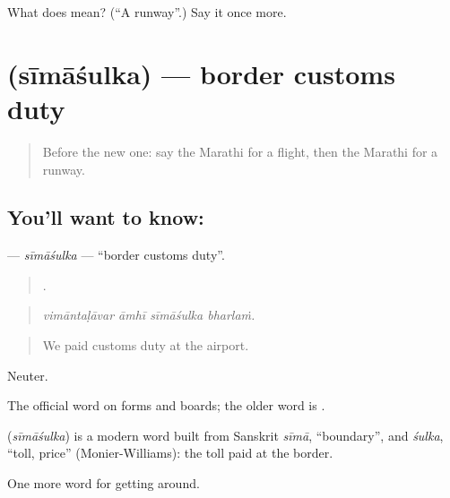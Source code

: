 \begin{tcolorbox}[breakable,colback=teal!4,colframe=teal!35!black,title={Before you move on}]
What does  mean? (\textquotedblleft{}A runway\textquotedblright{}.) Say it once more.
\end{tcolorbox}
\section[\texorpdfstring{\mr{सीमाशुल्क} (sīmāśulka)}{सीमाशुल्क (sīmāśulka)}]{ (sīmāśulka) — border customs duty}

\label{lesson:MR-C405-simasulka}



\begin{quote}
Before the new one: say the Marathi for a flight, then the Marathi for a runway.
\end{quote}

\subsection*{You'll want to know: }
\textbf{} — \emph{sīmāśulka} — \textquotedblleft{}border customs duty\textquotedblright{}.

\begin{quote}
   .
\end{quote}

\begin{quote}
\emph{vimāntaḷāvar āmhī sīmāśulka bharlaṁ.}
\end{quote}

\begin{quote}
We paid customs duty at the airport.
\end{quote}

Neuter.

The official word on forms and boards; the older word is .

\begin{cousinweb}
\textbf{} (\emph{sīmāśulka}) is a modern word built from Sanskrit \emph{sīmā}, \textquotedblleft{}boundary\textquotedblright{}, and \emph{śulka}, \textquotedblleft{}toll, price\textquotedblright{} (Monier-Williams): the toll paid at the border.
\end{cousinweb}

\begin{grammarlens}[title={What you've built}]
One more word for getting around.
\end{grammarlens}


